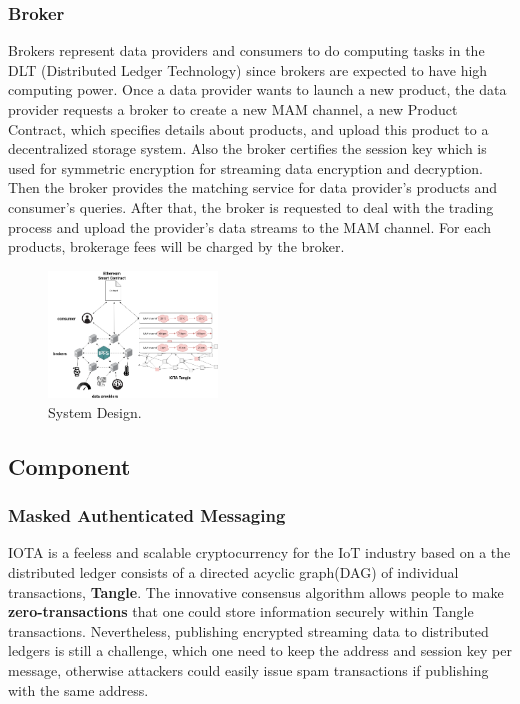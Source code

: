\documentclass[journal,a4paper]{IEEEtran}
\begin{document}
\subsubsection{Broker}
Brokers represent data providers and consumers to do computing tasks in the DLT (Distributed Ledger Technology) since brokers are expected to have high computing power. Once a data provider wants to launch a new product, the data provider requests a broker to create a new MAM channel, a new Product Contract, which specifies details about products, and upload this product to a decentralized storage system\cite{IPFS}. Also the broker certifies the session key which is used for symmetric encryption for streaming data encryption and decryption. Then the broker provides the matching service for data provider’s products and consumer’s queries. After that, the broker is requested to deal with the trading process and upload the provider’s data streams to the MAM channel. For each products, brokerage fees will be charged by the broker.

\begin{figure}[h]
	\centering
	\includegraphics[width=0.4\textwidth]{system_design}
	\caption{System Design.}
	\label{fig:system_design}
\end{figure}

\subsection{Component}
\subsubsection{Masked Authenticated Messaging}
IOTA\cite{IOTAwhitepaper} is a feeless and scalable cryptocurrency for the IoT industry based on a the distributed  ledger consists of a directed acyclic graph(DAG) of individual transactions, \textbf{Tangle}. The innovative consensus algorithm allows people to make \textbf{zero-transactions} that one could store information securely within Tangle transactions. Nevertheless, publishing encrypted streaming data to distributed ledgers is still a challenge, which one need to keep the address and session key per message, otherwise attackers could easily issue spam transactions if publishing with the same address. 
\end{document}

